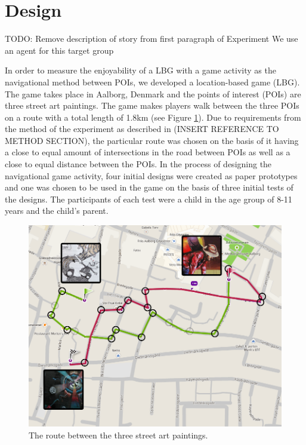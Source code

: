 \section{Design}
TODO:
Remove description of story from first paragraph of Experiment
We use an agent for this target group


In order to measure the enjoyability of a LBG with a game activity as the navigational method between POIs, we developed a location-based game (LBG). The game takes place in Aalborg, Denmark and the points of interest (POIs) are three street art paintings\cite{streetart}. The game makes players walk between the three POIs on a route with a total length of 1.8km (see Figure \ref{FinalRoute}). Due to requirements from the method of the experiment as described in (INSERT REFERENCE TO METHOD SECTION), the particular route was chosen on the basis of it having a close to equal amount of intersections in the road between POIs as well as a close to equal distance between the POIs. In the process of designing the navigational game activity, four initial designs were created as paper prototypes and one was chosen to be used in the game on the basis of three initial tests of the designs. The participants of each test were a child in the age group of 8-11 years and the child's parent.

\begin{figure}[hbtp]
\centering
\includegraphics[scale=0.3]{Pics/FinalRoute.png}
\caption{The route between the three street art paintings.}
\label{FinalRoute}
\end{figure}

